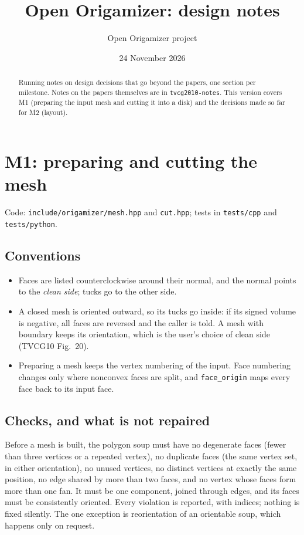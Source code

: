 \documentclass[11pt]{article}
\title{Open Origamizer: design notes}
\author{Open Origamizer project}
\date{24 November 2026}
\theoremstyle{definition}
\begin{document}
\maketitle

\begin{abstract}
Running notes on design decisions that go beyond the papers, one section per
milestone. Notes on the papers themselves are in \texttt{tvcg2010-notes}. This
version covers M1 (preparing the input mesh and cutting it into a disk) and the decisions made so far for M2 (layout).
\end{abstract}

\section{M1: preparing and cutting the mesh}

Code: \texttt{include/origamizer/mesh.hpp} and \texttt{cut.hpp}; tests in
\texttt{tests/cpp} and \texttt{tests/python}.

\subsection{Conventions}

\begin{itemize}[nosep]
  \item Faces are listed counterclockwise around their normal, and the normal
    points to the \emph{clean side}; tucks go to the other side.
  \item A closed mesh is oriented outward, so its tucks go inside: if its
    signed volume is negative, all faces are reversed and the caller is told.
    A mesh with boundary keeps its orientation, which is the user's choice of
    clean side (TVCG10 Fig.~20).
  \item Preparing a mesh keeps the vertex numbering of the input. Face
    numbering changes only where nonconvex faces are split, and
    \texttt{face\_origin} maps every face back to its input face.
\end{itemize}

\subsection{Checks, and what is not repaired}

Before a mesh is built, the polygon soup must have no degenerate faces (fewer
than three vertices or a repeated vertex), no duplicate faces (the same vertex
set, in either orientation), no unused vertices, no distinct vertices at
exactly the same position, no edge shared by more than two faces, and no
vertex whose faces form more than one fan. It must be one component, joined
through edges, and its faces must be consistently oriented. Every violation is
reported, with indices; nothing is fixed silently. The one exception is
reorientation of an orientable soup, which happens only on request.
\end{document}
